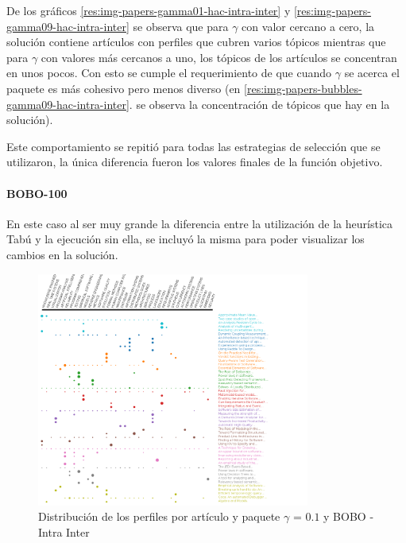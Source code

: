 De los gráficos \ref{res:img-papers-gamma01-hac-intra-inter} y \ref{res:img-papers-gamma09-hac-intra-inter} se observa que para $\gamma$ con valor cercano a cero, la solución contiene artículos con perfiles que cubren varios tópicos mientras que para $\gamma$ con valores más cercanos a uno, los tópicos de los artículos se concentran en unos pocos. Con esto se cumple el requerimiento de que cuando $\gamma$ se acerca el paquete es más cohesivo pero menos diverso (en \ref{res:img-papers-bubbles-gamma09-hac-intra-inter}. se observa la concentración de tópicos que hay en la solución).

Este comportamiento se repitió para todas las estrategias de selección que se utilizaron, la única diferencia fueron los valores finales de la función objetivo.
\paragraph{BOBO-100}
En este caso al ser muy grande la diferencia entre la utilización de la heurística Tabú y la ejecución sin ella,  se incluyó la misma para poder visualizar los cambios en la solución.
\begin{figure}[H]
  \centering
    \includegraphics[width=0.8\textwidth]{resultados/papers/BOBO/INTRA_INTER/gamma-01.png}
  \caption{Distribución de los perfiles por artículo y paquete $\gamma$ = $0.1$ y BOBO - Intra Inter}
  \label{res:img-papers-gamma01-bobo-intra-inter}
\end{figure}

